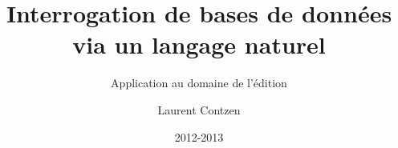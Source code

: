\documentclass[pdf]{beamer}
\title[Interrogation de bases de données via un langage naturel]{Interrogation de bases de données via un langage naturel}
\subtitle{Application au domaine de l'édition}
\author[Laurent Contzen]{Laurent Contzen}
\date{2012-2013}
\begin{document}
\frame{\titlepage}
\end{document}
